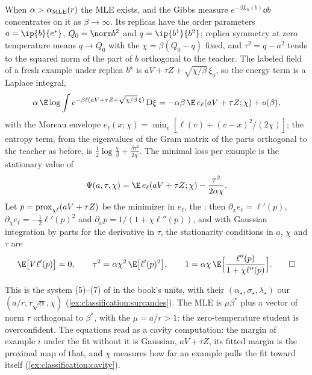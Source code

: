 \begin{refsection}
\begin{heuristic}
When $\alpha>\alpha_{\mathrm{MLE}}(r)$ the MLE exists, and the Gibbs measure $e^{-\beta L_n(b)}\dd b$ concentrates on it as $\beta\to\infty$. Its replicas have the order parameters $a=\ip{b}{e^*}$, $Q_0=\norm b^2$ and $q=\ip{b^1}{b^2}$; replica symmetry at zero temperature means $q\to Q_0$ with the  $\chi=\beta(Q_0-q)$ fixed, and $\tau^2=q-a^2$ tends to the squared norm of the part of $b$ orthogonal to the teacher. The labeled field of a fresh example under replica $b^a$ is $aV+\tau Z+\sqrt{\chi/\beta}\,\xi_a$, so the energy term is a Laplace integral,
\[
\alpha\,\E\log\int e^{-\beta\ell(aV+\tau Z+\sqrt{\chi/\beta}\,\xi)}\,\mathrm D\xi=-\alpha\beta\,\E\,e_\ell(aV+\tau Z;\chi)+o(\beta),
\]
with the Moreau envelope $e_\ell(x;\chi)=\min_v[\ell(v)+(v-x)^2/(2\chi)]$; the entropy term, from the eigenvalues of the Gram matrix of the parts orthogonal to the teacher as before, is $\frac12\log\frac\chi\beta+\frac{\beta\tau^2}{2\chi}$. The minimal loss per example is the stationary value of
\begin{equation}\label{eq:classification:Psi}
\Psi(a,\tau,\chi)=\E\,e_\ell(aV+\tau Z;\chi)-\frac{\tau^2}{2\alpha\chi}.
\end{equation}
Let $p=\operatorname{prox}_{\chi\ell}(aV+\tau Z)$ be the minimizer in $e_\ell$, the ; then $\partial_xe_\ell=\ell'(p)$, $\partial_\chi e_\ell=-\frac12\ell'(p)^2$ and $\partial_xp=1/(1+\chi\ell''(p))$, and with Gaussian integration by parts for the derivative in $\tau$, the stationarity conditions in $a$, $\chi$ and $\tau$ are
\begin{equation}\label{eq:classification:sc}
\E\bigl[V\ell'(p)\bigr]=0,\qquad\tau^2=\alpha\chi^2\,\E\bigl[\ell'(p)^2\bigr],\qquad1=\alpha\chi\,\E\Bigl[\frac{\ell''(p)}{1+\chi\ell''(p)}\Bigr].\qedhere
\end{equation}
\end{heuristic}

This is the system (5)--(7) of \textcite{SurCandes2019} in the book's units, with their $(\alpha_\star,\sigma_\star,\lambda_\star)$ our $(a/r,\tau\sqrt\alpha,\chi)$ (\cref{ex:classification:surcandes}). The MLE is $\mu\beta^*$ plus a vector of norm $\tau$ orthogonal to $\beta^*$, with the  $\mu=a/r>1$: the zero-temperature student is overconfident. The equations read as a cavity computation: the margin of example $i$ under the fit without it is Gaussian, $aV+\tau Z$, its fitted margin is the proximal map of that, and $\chi$ measures how far an example pulls the fit toward itself (\cref{ex:classification:cavity}).


\end{refsection}
